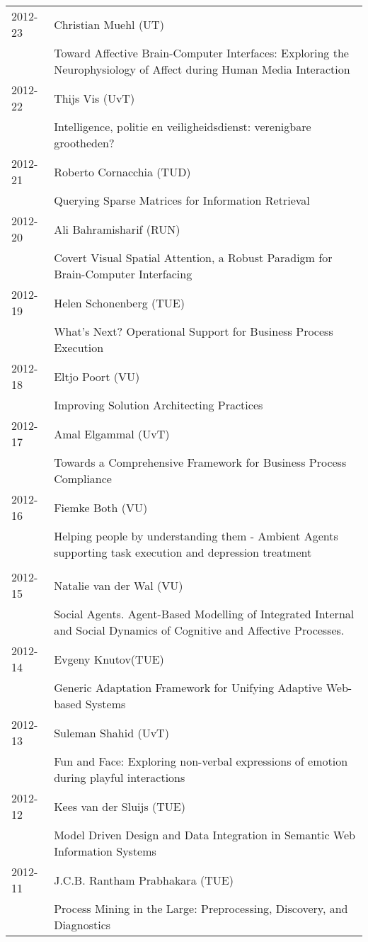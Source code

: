 \begin{longtable}{p{1.25cm}p{10.75cm}}
2012-23 & Christian Muehl (UT) \\& Toward Affective Brain-Computer Interfaces: Exploring the Neurophysiology of Affect during Human Media Interaction \\
2012-22 & Thijs Vis (UvT) \\& Intelligence, politie en veiligheidsdienst: verenigbare grootheden? \\
2012-21 & Roberto Cornacchia (TUD) \\& Querying Sparse Matrices for Information Retrieval \\
2012-20 & Ali Bahramisharif (RUN) \\& Covert Visual Spatial Attention, a Robust Paradigm for Brain-Computer \newline Interfacing \\
2012-19 & Helen Schonenberg (TUE) \\& What's Next? Operational Support for Business Process Execution \\
2012-18 & Eltjo Poort (VU) \\& Improving Solution Architecting Practices \\
2012-17 & Amal Elgammal (UvT) \\& Towards a Comprehensive Framework for Business Process Compliance \\
2012-16 & Fiemke Both (VU) \\& Helping people by understanding them - Ambient Agents supporting task execution and depression treatment \\
\\
2012-15 & Natalie van der Wal (VU) \\& Social Agents. Agent-Based Modelling of Integrated Internal and Social Dynamics of Cognitive and Affective Processes. \\
2012-14 & Evgeny Knutov(TUE) \\& Generic Adaptation Framework for Unifying Adaptive Web-based Systems \\
2012-13 & Suleman Shahid (UvT) \\& Fun and Face: Exploring non-verbal expressions of emotion during playful interactions \\
2012-12 & Kees van der Sluijs (TUE) \\& Model Driven Design and Data Integration in Semantic Web Information Systems \\
2012-11 & J.C.B. Rantham Prabhakara (TUE) \\& Process Mining in the Large: Preprocessing, Discovery, and Diagnostics \\

\end{longtable}
